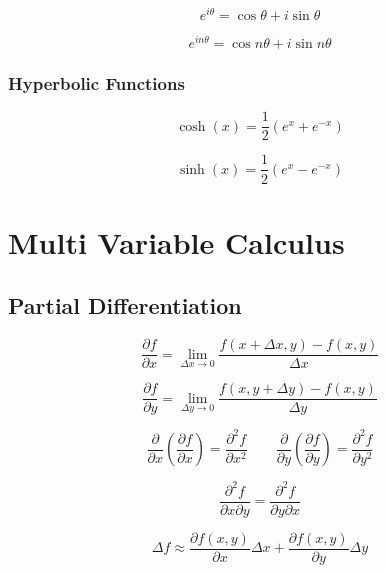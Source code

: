 \documentclass[]{report}
\begin{document}
\begin{equation*}
    e^{i\theta} = \cos\theta + i\sin\theta
\end{equation*}

\begin{equation*}
    e^{in\theta} = \cos n\theta + i \sin n\theta
\end{equation*}

\section{Hyperbolic Functions}

\begin{equation*}
    \cosh(x) = \frac{1}{2}(e^x + e^{-x})
\end{equation*}

\begin{equation*}
    \sinh(x) = \frac{1}{2}(e^x - e^{-x})
\end{equation*}

\part{Multi Variable Calculus}
\chapter{Partial Differentiation}

\begin{equation*}
    \frac{\partial f}{\partial x} = \lim_{\Delta x \to 0}\frac{f(x + \Delta x, y) - f(x, y)}{\Delta x}
\end{equation*}

\begin{equation*}
    \frac{\partial f}{\partial y} = \lim_{\Delta y \to 0}\frac{f(x, y + \Delta y) - f(x, y)}{\Delta y}
\end{equation*}

\[\frac{\partial}{\partial x}\left(\frac{\partial f}{\partial x}\right) = \frac{\partial^{2}f}{\partial x ^{2}} \qquad \frac{\partial}{\partial y}\left(\frac{\partial f}{\partial y}\right) = \frac{\partial^{2}f}{\partial y ^{2}}\]

\begin{equation*}
    \frac{\partial^{2}f}{\partial x \partial y} = \frac{\partial^{2}f}{\partial y \partial x}
\end{equation*}

\begin{equation*}
    \Delta f \approx \frac{\partial f(x, y)}{\partial x}\Delta x + \frac{\partial f(x, y)}{\partial y}\Delta y
\end{equation*}
\end{document}
